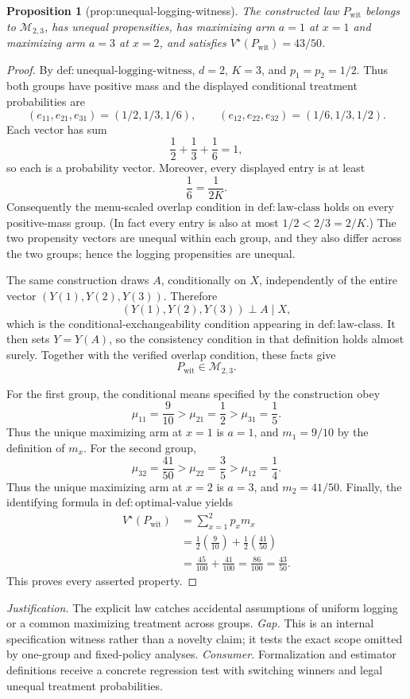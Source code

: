 \documentclass{article}
\newtheorem{proposition}{Proposition}
\begin{document}
\begin{proposition}[prop:unequal-logging-witness]\label{prop:unequal-logging-witness}
The constructed law \(P_{\mathrm{wit}}\) belongs to \(\mathcal M_{2,3}\), has unequal propensities, has maximizing arm \(a=1\) at \(x=1\) and maximizing arm \(a=3\) at \(x=2\), and satisfies \(V^\star(P_{\mathrm{wit}})=43/50\).
\end{proposition}
\begin{proof}
By \(\mathrm{def{:}unequal\text{-}logging\text{-}witness}\), \(d=2\), \(K=3\), and \(p_1=p_2=1/2\).  Thus both groups have positive mass and the displayed conditional treatment probabilities are
\[
(e_{11},e_{21},e_{31})=(1/2,1/3,1/6),
\qquad
(e_{12},e_{22},e_{32})=(1/6,1/3,1/2).
\]
Each vector has sum
\[
\frac12+\frac13+\frac16=1,
\]
so each is a probability vector.  Moreover, every displayed entry is at least
\[
\frac16=\frac{1}{2K}.
\]
Consequently the menu-scaled overlap condition in \(\mathrm{def{:}law\text{-}class}\) holds on every positive-mass group.  (In fact every entry is also at most \(1/2<2/3=2/K\).)  The two propensity vectors are unequal within each group, and they also differ across the two groups; hence the logging propensities are unequal.

The same construction draws \(A\), conditionally on \(X\), independently of the entire vector \((Y(1),Y(2),Y(3))\).  Therefore
\[
(Y(1),Y(2),Y(3))\mathrel{\perp}A\mid X,
\]
which is the conditional-exchangeability condition appearing in \(\mathrm{def{:}law\text{-}class}\).  It then sets \(Y=Y(A)\), so the consistency condition in that definition holds almost surely.  Together with the verified overlap condition, these facts give
\[
P_{\mathrm{wit}}\in\mathcal M_{2,3}.
\]

For the first group, the conditional means specified by the construction obey
\[
\mu_{11}=\frac9{10}>\mu_{21}=\frac12>\mu_{31}=\frac15.
\]
Thus the unique maximizing arm at \(x=1\) is \(a=1\), and \(m_1=9/10\) by the definition of \(m_x\).  For the second group,
\[
\mu_{32}=\frac{41}{50}>\mu_{22}=\frac35>\mu_{12}=\frac14.
\]
Thus the unique maximizing arm at \(x=2\) is \(a=3\), and \(m_2=41/50\).  Finally, the identifying formula in \(\mathrm{def{:}optimal\text{-}value}\) yields
\[
\begin{aligned}
V^\star(P_{\mathrm{wit}})
  &=\sum_{x=1}^{2}p_xm_x \\
  &=\frac12\left(\frac9{10}\right)
    +\frac12\left(\frac{41}{50}\right) \\
  &=\frac{45}{100}+\frac{41}{100}
   =\frac{86}{100}
   =\frac{43}{50}.
\end{aligned}
\]
This proves every asserted property.
\end{proof}
\par\smallskip\noindent \textit{Justification.} The explicit law catches accidental assumptions of uniform logging or a common maximizing treatment across groups. \textit{Gap.} This is an internal specification witness rather than a novelty claim; it tests the exact scope omitted by one-group and fixed-policy analyses. \textit{Consumer.} Formalization and estimator definitions receive a concrete regression test with switching winners and legal unequal treatment probabilities.
\end{document}
